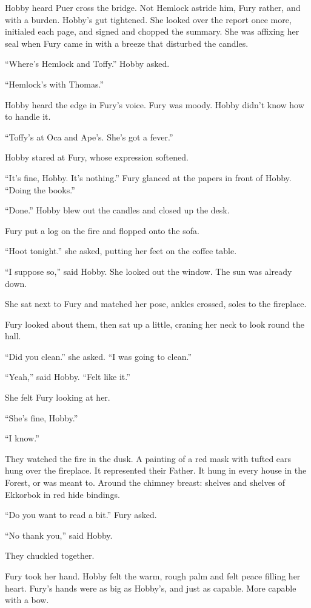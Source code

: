 \documentclass[11pt,a5paper]{article}
\begin{document}
Hobby heard Puer cross the bridge. Not Hemlock astride him, Fury rather, and with a burden. Hobby's gut tightened. She looked over the report once more, initialed each page, and signed and chopped the summary. She was affixing her seal when Fury came in with a breeze that disturbed the candles.

``Where's Hemlock and Toffy.'' Hobby asked.

``Hemlock's with Thomas.''

Hobby heard the edge in Fury's voice. Fury was moody. Hobby didn't know how to handle it.

``Toffy's at Oca and Ape's. She's got a fever.''

Hobby stared at Fury, whose expression softened.

``It's fine, Hobby. It's nothing.'' Fury glanced at the papers in front of Hobby. ``Doing the books.''

``Done.'' Hobby blew out the candles and closed up the desk.

Fury put a log on the fire and flopped onto the sofa.

``Hoot tonight.'' she asked, putting her feet on the coffee table.

``I suppose so,'' said Hobby. She looked out the window. The sun was already down.

She sat next to Fury and matched her pose, ankles crossed, soles to the fireplace.

Fury looked about them, then sat up a little, craning her neck to look round the hall.

``Did you clean.'' she asked. ``I was going to clean.''

``Yeah,'' said Hobby. ``Felt like it.''

She felt Fury looking at her.

``She's fine, Hobby.''

``I know.''

They watched the fire in the dusk. A painting of a red mask with tufted ears hung over the fireplace. It represented their Father. It hung in every house in the Forest, or was meant to. Around the chimney breast: shelves and shelves of Ekkorbok in red hide bindings.

``Do you want to read a bit.'' Fury asked.

``No thank you,'' said Hobby.

They chuckled together.

Fury took her hand. Hobby felt the warm, rough palm and felt peace filling her heart. Fury's hands were as big as Hobby's, and just as capable. More capable with a bow.
\end{document}

